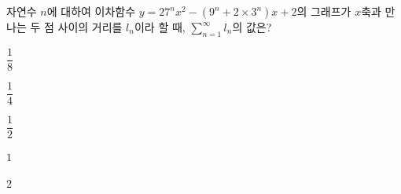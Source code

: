 자연수 $n$에 대하여 이차함수 $y=27^nx^2-(9^n+2\times 3^n)x+2$의 그래프가 $x$축과 만나는 두 점 사이의 거리를 $l_n$이라 할 때, $\displaystyle\sum_{n=1}^{\infty} l_n$의 값은?
\begin{choices32}{\rule[-3ex]{0pt}{8ex}$\dfrac{1}{8}$}{\rule[-3ex]{0pt}{8ex}$\dfrac{1}{4}$}{\rule[-3ex]{0pt}{8ex}$\dfrac{1}{2}$}{\rule[-3ex]{0pt}{8ex}$1$}{\rule[-3ex]{0pt}{8ex}$2$}\end{choices32}
